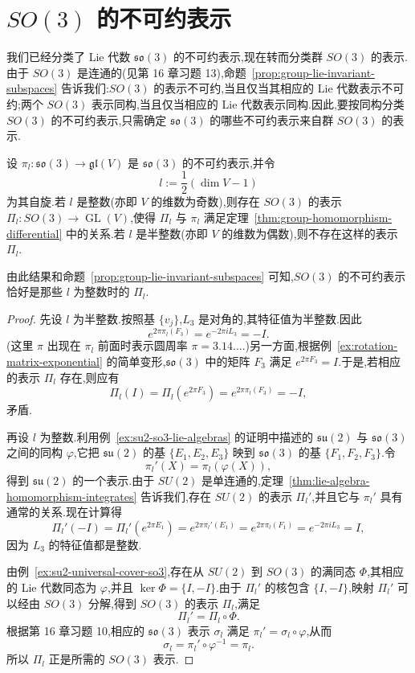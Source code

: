 \section{$SO(3)$ 的不可约表示}
\label{sec:irreducible-so3-group-representations}

我们已经分类了 Lie 代数 $\mathfrak{so}(3)$ 的不可约表示,现在转而分类群 $SO(3)$ 的表示.由于 $SO(3)$ 是连通的(见第 16 章习题 13),命题~\ref{prop:group-lie-invariant-subspaces} 告诉我们:$SO(3)$ 的表示不可约,当且仅当其相应的 Lie 代数表示不可约;两个 $SO(3)$ 表示同构,当且仅当相应的 Lie 代数表示同构.因此,要按同构分类 $SO(3)$ 的不可约表示,只需确定 $\mathfrak{so}(3)$ 的哪些不可约表示来自群 $SO(3)$ 的表示.

\begin{proposition}[$SO(3)$ 的不可约表示]\label{prop:so3-group-representations}
设 $\pi_l:\mathfrak{so}(3)\to\mathfrak{gl}(V)$ 是 $\mathfrak{so}(3)$ 的不可约表示,并令
\[
l:=\frac12(\dim V-1)
\]
为其自旋.若 $l$ 是整数(亦即 $V$ 的维数为奇数),则存在 $SO(3)$ 的表示 $\Pi_l:SO(3)\to\operatorname{GL}(V)$,使得 $\Pi_l$ 与 $\pi_l$ 满足定理~\ref{thm:group-homomorphism-differential} 中的关系.若 $l$ 是半整数(亦即 $V$ 的维数为偶数),则不存在这样的表示 $\Pi_l$.
\end{proposition}

由此结果和命题~\ref{prop:group-lie-invariant-subspaces} 可知,$SO(3)$ 的不可约表示恰好是那些 $l$ 为整数时的 $\Pi_l$.

\begin{proof}
先设 $l$ 为半整数.按照基 $\{v_j\}$,$L_3$ 是对角的,其特征值为半整数.因此
\[
 e^{2\pi\pi_l(F_3)}=e^{-2\pi iL_3}=-I.
\]
(这里 $\pi$ 出现在 $\pi_l$ 前面时表示圆周率 $\pi=3.14\ldots$.)另一方面,根据例~\ref{ex:rotation-matrix-exponential} 的简单变形,$\mathfrak{so}(3)$ 中的矩阵 $F_3$ 满足 $e^{2\pi F_3}=I$.于是,若相应的表示 $\Pi_l$ 存在,则应有
\[
 \Pi_l(I)=\Pi_l(e^{2\pi F_3})=e^{2\pi\pi_l(F_3)}=-I,
\]
矛盾.

再设 $l$ 为整数.利用例~\ref{ex:su2-so3-lie-algebras} 的证明中描述的 $\mathfrak{su}(2)$ 与 $\mathfrak{so}(3)$ 之间的同构 $\varphi$,它把 $\mathfrak{su}(2)$ 的基 $\{E_1,E_2,E_3\}$ 映到 $\mathfrak{so}(3)$ 的基 $\{F_1,F_2,F_3\}$.令
\[
 \pi_l'(X)=\pi_l(\varphi(X)),
\]
得到 $\mathfrak{su}(2)$ 的一个表示.由于 $SU(2)$ 是单连通的,定理~\ref{thm:lie-algebra-homomorphism-integrates} 告诉我们,存在 $SU(2)$ 的表示 $\Pi_l'$,并且它与 $\pi_l'$ 具有通常的关系.现在计算得
\[
 \Pi_l'(-I)=\Pi_l'(e^{2\pi E_1})
 =e^{2\pi\pi_l'(E_1)}
 =e^{2\pi\pi_l(F_1)}
 =e^{-2\pi iL_3}=I,
\]
因为 $L_3$ 的特征值都是整数.

由例~\ref{ex:su2-universal-cover-so3},存在从 $SU(2)$ 到 $SO(3)$ 的满同态 $\Phi$,其相应的 Lie 代数同态为 $\varphi$,并且 $\ker\Phi=\{I,-I\}$.由于 $\Pi_l'$ 的核包含 $\{I,-I\}$,映射 $\Pi_l'$ 可以经由 $SO(3)$ 分解,得到 $SO(3)$ 的表示 $\Pi_l$,满足
\[
 \Pi_l'=\Pi_l\circ\Phi.
\]
根据第 16 章习题 10,相应的 $\mathfrak{so}(3)$ 表示 $\sigma_l$ 满足 $\pi_l'=\sigma_l\circ\varphi$,从而
\[
 \sigma_l=\pi_l'\circ\varphi^{-1}=\pi_l.
\]
所以 $\Pi_l$ 正是所需的 $SO(3)$ 表示.
\end{proof}

